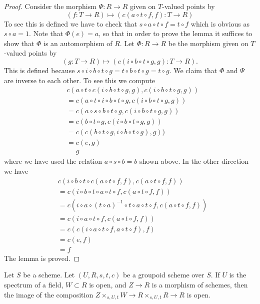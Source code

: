 \begin{proof}
\medskip\noindent
Consider the morphism $\Psi : R \to R$ given on $T$-valued points
by
$$
(f : T \to R) \longmapsto (c(a \circ t \circ f, f) : T \to R)
$$
To see this is defined we have to check that
$s \circ a \circ t \circ f = t \circ f$ which is obvious as $s \circ a = 1$.
Note that $\Phi(e) = a$, so that in order to prove the lemma it
suffices to show that $\Phi$ is an automorphism of $R$.
Let $\Phi : R \to R$ be the morphism given on $T$-valued points by
$$
(g : T \to R) \longmapsto (c(i \circ b \circ t \circ g, g) : T \to R).
$$
This is defined because
$s \circ i \circ b \circ t \circ g = t \circ b \circ t \circ g =
t \circ g$. We claim that $\Phi$ and $\Psi$ are inverse to
each other. To see this we compute
\begin{align*}
& c(a \circ t \circ c(i \circ b \circ t \circ g, g),
c(i \circ b \circ t \circ g, g)) \\
& =
c(a \circ t \circ i \circ b \circ t \circ g,
c(i \circ b \circ t \circ g, g)) \\
& =
c(a \circ s \circ b \circ t \circ g,
c(i \circ b \circ t \circ g, g)) \\
& =
c(b \circ t \circ g, c(i \circ b \circ t \circ g, g)) \\
& =
c(c(b \circ t \circ g, i \circ b \circ t \circ g), g)) \\
& =
c(e, g) \\
& = g
\end{align*}
where we have used the relation $a \circ s \circ b = b$ shown above.
In the other direction we have
\begin{align*}
& c(i \circ b \circ t \circ c(a \circ t \circ f, f), c(a \circ t \circ f, f)) \\
& =
c(i \circ b \circ t \circ a \circ t \circ f, c(a \circ t \circ f, f)) \\
& =
c(i \circ a \circ (t \circ a)^{-1} \circ t \circ a \circ t \circ f,
c(a \circ t \circ f, f)) \\
& =
c(i \circ a \circ t \circ f, c(a \circ t \circ f, f)) \\
& =
c(c(i \circ a \circ t \circ f, a \circ t \circ f), f) \\
& =
c(e, f) \\
& = f
\end{align*}
The lemma is proved.
\end{proof}

\begin{lemma}
\label{lemma-groupoid-on-field-translate-open}
Let $S$ be a scheme. Let $(U, R, s, t, c)$ be a groupoid scheme
over $S$. If $U$ is the spectrum of a field, $W \subset R$ is open,
and $Z \to R$ is a morphism of schemes, then the image of the
composition $Z \times_{s, U, t} W \to R \times_{s, U, t} R \to R$ is open.
\end{lemma}

